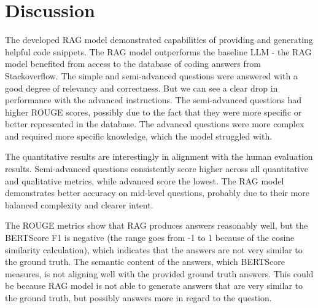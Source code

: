 \documentclass[fleqn,moreauthors,10pt]{ds_report}
\begin{document}
\section*{Discussion}
The developed RAG model demonstrated capabilities of providing and generating helpful code snippets. The RAG model outperforms the baseline LLM - the RAG model benefited from access to the database of coding answers from Stackoverflow. The simple and semi-advanced questions were answered with a good degree of relevancy and correctness. But we can see a clear drop in performance with the advanced instructions. The semi-advanced questions had higher ROUGE scores, possibly due to the fact that they were more specific or better represented in the database. The advanced questions were more complex and required more specific knowledge, which the model struggled with. 

The quantitative results are interestingly in alignment with the human evaluation results. Semi-advanced questions consistently score higher across all quantitative and qualitative metrics, while advanced score the lowest. The RAG model demonstrates better accuracy on mid-level questions, probably due to their more balanced complexity and clearer intent.

The ROUGE metrics show that RAG produces answers reasonably well, but the BERTScore F1 is negative (the range goes from -1 to 1 because of the cosine similarity calculation), which indicates that the answers are not very similar to the ground truth. The semantic content of the answers, which BERTScore measures, is not aligning well with the provided ground truth answers. This could be because RAG model is not able to generate answers that are very similar to the ground truth, but possibly answers more in regard to the question. 







\end{document}
